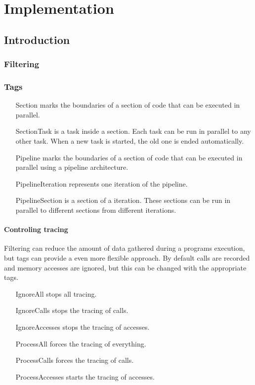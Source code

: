 \chapter{Implementation}

\section{Introduction}

\subsection{Filtering}

\subsection{Tags}

\begin{itemize}
	\item [Section] marks the boundaries of a section of code that can be executed in parallel.
	\item [SectionTask] is a task inside a section. Each task can be run in parallel to any other task. When a new task is started, the old one is ended automatically.
	\item [Pipeline] marks the boundaries of a section of code that can be executed in parallel using a pipeline architecture.
	\item [PipelineIteration] represents one iteration of the pipeline.
	\item [PipelineSection] is a section of a iteration. These sections can be run in parallel to different sections from different iterations.
\end{itemize}

\subsubsection{Controling tracing}
Filtering can reduce the amount of data gathered during a programs execution, but tags can provide a even more flexible approach. By default calls are recorded and memory accesses are ignored, but this can be changed with the appropriate tags.

\begin{itemize}
	\item [IgnoreAll] stops all tracing.
	\item [IgnoreCalls] stops the tracing of calls.
	\item [IgnoreAccesses] stops the tracing of accesses.
	\item [ProcessAll] forces the tracing of everything.
	\item [ProcessCalls] forces the tracing of calls.
	\item [ProcessAccesses] starts the tracing of accesses.
\end{itemize}

